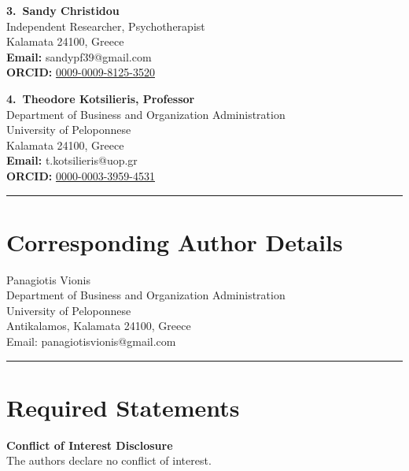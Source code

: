 \documentclass[12pt,a4paper]{article}
\begin{document}
\vspace{0.8cm}

\noindent\textbf{3.~Sandy Christidou}\\
Independent Researcher, Psychotherapist\\
Kalamata 24100, Greece\\
\textbf{Email:} sandypf39@gmail.com\\
\textbf{ORCID:} \href{https://orcid.org/0009-0009-8125-3520}{0009-0009-8125-3520}

\vspace{0.8cm}

\noindent\textbf{4.~Theodore Kotsilieris, Professor}\\
Department of Business and Organization Administration\\
University of Peloponnese\\
Kalamata 24100, Greece\\
\textbf{Email:} t.kotsilieris@uop.gr\\
\textbf{ORCID:} \href{https://orcid.org/0000-0003-3959-4531}{0000-0003-3959-4531}

\vspace{1cm}

\noindent\rule{\textwidth}{0.4pt}

\section*{Corresponding Author Details}

\noindent Panagiotis Vionis\\
Department of Business and Organization Administration\\
University of Peloponnese\\
Antikalamos, Kalamata 24100, Greece\\
Email: panagiotisvionis@gmail.com

\vspace{1cm}

\noindent\rule{\textwidth}{0.4pt}

\section*{Required Statements}

\noindent\textbf{Conflict of Interest Disclosure}\\
The authors declare no conflict of interest.

\vspace{0.6cm}
\end{document}
